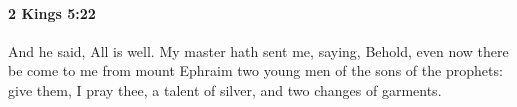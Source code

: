 
		\paragraph{2 Kings 5:22} %
			\label{2KINGS-5-22}

			And he said, All is well. My master hath sent me, saying, Behold, even now there be come to me from mount Ephraim two young men of the sons of the prophets: give them, I pray thee, a talent of silver, and two changes of garments.


